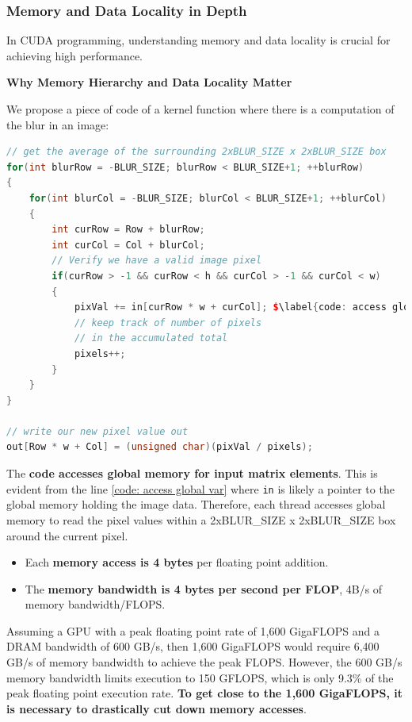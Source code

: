 \subsubsection{Memory and Data Locality in Depth}

In CUDA programming, understanding memory and data locality is crucial for achieving high performance. 

\highspace
\begin{flushleft}
    \textcolor{Green3}{ \textbf{Why Memory Hierarchy and Data Locality Matter}}
\end{flushleft}
We propose a piece of code of a kernel function where there is a computation of the blur in an image:
\begin{lstlisting}[language=C++]
// get the average of the surrounding 2xBLUR_SIZE x 2xBLUR_SIZE box
for(int blurRow = -BLUR_SIZE; blurRow < BLUR_SIZE+1; ++blurRow)
{
    for(int blurCol = -BLUR_SIZE; blurCol < BLUR_SIZE+1; ++blurCol)
    {
        int curRow = Row + blurRow;
        int curCol = Col + blurCol;
        // Verify we have a valid image pixel
        if(curRow > -1 && curRow < h && curCol > -1 && curCol < w)
        {
            pixVal += in[curRow * w + curCol]; $\label{code: access global var}$
            // keep track of number of pixels
            // in the accumulated total
            pixels++;
        }
    }
}

// write our new pixel value out
out[Row * w + Col] = (unsigned char)(pixVal / pixels);
\end{lstlisting}

\noindent
The \textbf{code accesses global memory for input matrix elements}. This is evident from the line \ref{code: access global var} where \texttt{in} is likely a pointer to the global memory holding the image data. Therefore, each thread accesses global memory to read the pixel values within a 2xBLUR\_SIZE x 2xBLUR\_SIZE box around the current pixel.
\begin{itemize}
    \item Each \textbf{memory access is 4 bytes} per floating point addition.
    \item The \textbf{memory bandwidth is 4 bytes per second per FLOP}, 4B/s of memory bandwidth/FLOPS.
\end{itemize}
Assuming a GPU with a peak floating point rate of 1,600 GigaFLOPS and a DRAM bandwidth of 600 GB/s, then 1,600 GigaFLOPS would require 6,400 GB/s of memory bandwidth to achieve the peak FLOPS. However, the 600 GB/s memory bandwidth limits execution to 150 GFLOPS, which is only 9.3\% of the peak floating point execution rate. \textbf{To get close to the 1,600 GigaFLOPS, it is necessary to drastically cut down memory accesses}.

